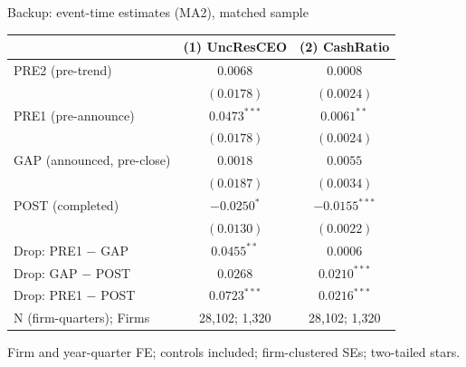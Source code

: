\documentclass[aspectratio=169, 11pt]{beamer}
\begin{document}
\begin{frame}[noframenumbering]{Backup: event-time estimates (MA2), matched sample}
  \begin{center}
  \footnotesize
  \begin{tabular}{lcc}
    \toprule
    & (1) UncResCEO & (2) CashRatio \\
    \midrule
    PRE2 (pre-trend) & $0.0068$ & $0.0008$ \\
    & $(0.0178)$ & $(0.0024)$ \\
    PRE1 (pre-announce) & $\mathbf{0.0473}^{***}$ & $\mathbf{0.0061}^{**}$ \\
    & $(0.0178)$ & $(0.0024)$ \\
    GAP (announced, pre-close) & $0.0018$ & $0.0055$ \\
    & $(0.0187)$ & $(0.0034)$ \\
    POST (completed) & $\mathbf{-0.0250}^{*}$ & $\mathbf{-0.0155}^{***}$ \\
    & $(0.0130)$ & $(0.0022)$ \\
    \midrule
    Drop: PRE1 $-$ GAP & $\mathbf{0.0455}^{**}$ & $0.0006$ \\
    Drop: GAP $-$ POST & $0.0268$ & $\mathbf{0.0210}^{***}$ \\
    Drop: PRE1 $-$ POST & $\mathbf{0.0723}^{***}$ & $\mathbf{0.0216}^{***}$ \\
    \midrule
    N (firm-quarters); Firms & 28{,}102; 1{,}320 & 28{,}102; 1{,}320 \\
    \bottomrule
  \end{tabular}
  \end{center}
  {\scriptsize Firm and year-quarter FE; controls included; firm-clustered SEs;
  two-tailed stars.}
\end{frame}
\end{document}
